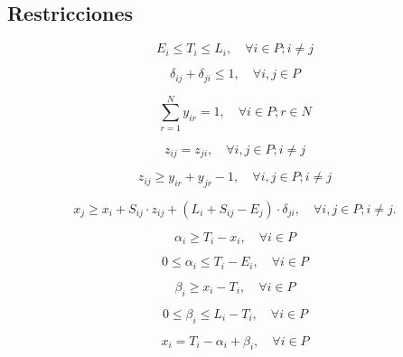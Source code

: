 \documentclass[letter, 10pt]{article}
\begin{document}
\subsection{Restricciones}

\begin{equation}
E_{i} \leq T_{i} \leq L_{i}, \quad \forall i \in P ; i \neq j
\label{r1}
\end{equation}

\begin{equation}
\delta_{i j}+\delta_{j i} \leq 1, \quad \forall i, j \in P
\label{r2}
\end{equation}

\begin{equation}
\sum_{r=1}^{N} y_{i r}=1, \quad \forall i \in P ; r \in N
\label{r3}
\end{equation}

\begin{equation}
z_{i j}=z_{j i}, \quad \forall i, j \in P ; i \neq j
\label{r4}
\end{equation}

\begin{equation}
z_{i j} \geq y_{i r}+y_{j r}-1, \quad \forall i, j \in P ; i \neq j
\label{r5}
\end{equation}

\begin{equation}
x_{j} \geq x_{i}+S_{i j} \cdot z_{i j}+\left(L_{i}+S_{i j}-E_{j}\right) \cdot \delta_{j i}, \quad \forall i, j \in P; i \neq j.
\label{r6}
\end{equation}

\begin{equation}
\alpha_{i} \geq T_{i}-x_{i}, \quad \forall i \in P
\label{r7}
\end{equation}

\begin{equation}
0 \leq \alpha_{i} \leq T_{i}-E_{i}, \quad \forall i \in P
\label{r8}
\end{equation}

\begin{equation}
\beta_{i} \geq x_{i}-T_{i}, \quad \forall i \in P
\label{r9}
\end{equation}

\begin{equation}
0 \leq \beta_{i} \leq L_{i}-T_{i}, \quad \forall i \in P
\label{r10}
\end{equation}

\begin{equation}
x_{i}=T_{i}-\alpha_{i}+\beta_{i}, \quad \forall i \in P
\label{r11}
\end{equation}
\end{document}
